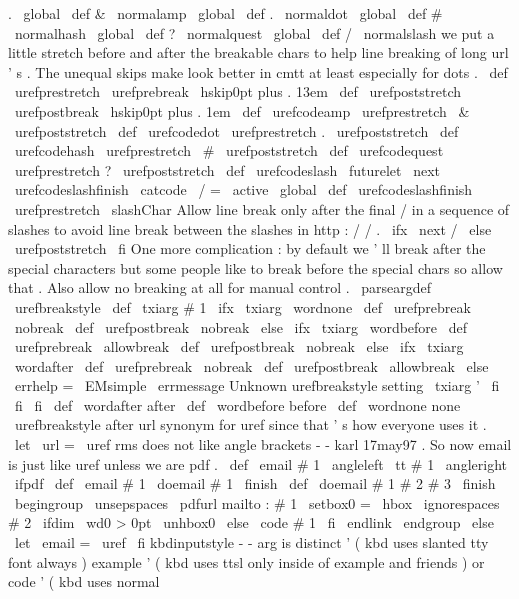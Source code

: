 {{{.
\
global
\
def
&
{
\
normalamp
}
\
global
\
def
.
{
\
normaldot
}
\
global
\
def
#
{
\
normalhash
}
\
global
\
def
?
{
\
normalquest
}
\
global
\
def
/
{
\
normalslash
}
}
%
we
put
a
little
stretch
before
and
after
the
breakable
chars
to
help
%
line
breaking
of
long
url
'
s
.
The
unequal
skips
make
look
better
in
%
cmtt
at
least
especially
for
dots
.
\
def
\
urefprestretch
{
\
urefprebreak
\
hskip0pt
plus
.
13em
}
\
def
\
urefpoststretch
{
\
urefpostbreak
\
hskip0pt
plus
.
1em
}
%
\
def
\
urefcodeamp
{
\
urefprestretch
\
&
\
urefpoststretch
}
\
def
\
urefcodedot
{
\
urefprestretch
.
\
urefpoststretch
}
\
def
\
urefcodehash
{
\
urefprestretch
\
#
\
urefpoststretch
}
\
def
\
urefcodequest
{
\
urefprestretch
?
\
urefpoststretch
}
\
def
\
urefcodeslash
{
\
futurelet
\
next
\
urefcodeslashfinish
}
{
\
catcode
\
/
=
\
active
\
global
\
def
\
urefcodeslashfinish
{
%
\
urefprestretch
\
slashChar
%
Allow
line
break
only
after
the
final
/
in
a
sequence
of
%
slashes
to
avoid
line
break
between
the
slashes
in
http
:
/
/
.
\
ifx
\
next
/
\
else
\
urefpoststretch
\
fi
}
}
%
One
more
complication
:
by
default
we
'
ll
break
after
the
special
%
characters
but
some
people
like
to
break
before
the
special
chars
so
%
allow
that
.
Also
allow
no
breaking
at
all
for
manual
control
.
%
\
parseargdef
\
urefbreakstyle
{
%
\
def
\
txiarg
{
#
1
}
%
\
ifx
\
txiarg
\
wordnone
\
def
\
urefprebreak
{
\
nobreak
}
\
def
\
urefpostbreak
{
\
nobreak
}
\
else
\
ifx
\
txiarg
\
wordbefore
\
def
\
urefprebreak
{
\
allowbreak
}
\
def
\
urefpostbreak
{
\
nobreak
}
\
else
\
ifx
\
txiarg
\
wordafter
\
def
\
urefprebreak
{
\
nobreak
}
\
def
\
urefpostbreak
{
\
allowbreak
}
\
else
\
errhelp
=
\
EMsimple
\
errmessage
{
Unknown
urefbreakstyle
setting
\
txiarg
'
}
%
\
fi
\
fi
\
fi
}
\
def
\
wordafter
{
after
}
\
def
\
wordbefore
{
before
}
\
def
\
wordnone
{
none
}
\
urefbreakstyle
after
%
url
synonym
for
uref
since
that
'
s
how
everyone
uses
it
.
%
\
let
\
url
=
\
uref
%
rms
does
not
like
angle
brackets
-
-
karl
17may97
.
%
So
now
email
is
just
like
uref
unless
we
are
pdf
.
%
%
\
def
\
email
#
1
{
\
angleleft
{
\
tt
#
1
}
\
angleright
}
\
ifpdf
\
def
\
email
#
1
{
\
doemail
#
1
\
finish
}
\
def
\
doemail
#
1
#
2
#
3
\
finish
{
\
begingroup
\
unsepspaces
\
pdfurl
{
mailto
:
#
1
}
%
\
setbox0
=
\
hbox
{
\
ignorespaces
#
2
}
%
\
ifdim
\
wd0
>
0pt
\
unhbox0
\
else
\
code
{
#
1
}
\
fi
\
endlink
\
endgroup
}
\
else
\
let
\
email
=
\
uref
\
fi
%
kbdinputstyle
-
-
arg
is
distinct
'
(
kbd
uses
slanted
tty
font
always
)
%
example
'
(
kbd
uses
ttsl
only
inside
of
example
and
friends
)
%
or
code
'
(
kbd
uses
normal
}}
